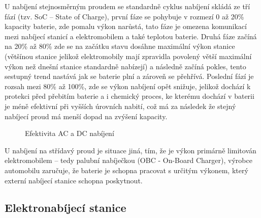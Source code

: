 \documentclass[a4paper,11pt]{article}
\begin{document}
U nabíjení stejnosměrným proudem se standardně cyklus nabíjení skládá ze tří fází (tzv. SoC -- State of Charge), první
fáze se pohybuje v rozmezí 0 až 20\% kapacity baterie, zde pomalu výkon narůstá, tato fáze je omezena komunikací
mezi nabíjecí stanicí a elektromobilem a také teplotou baterie. Druhá fáze začíná na 20\% až 80\% zde se na začátku
stavu dosáhne maximální výkon stanice (většínou stanice jelikož elektromobily mají zpravidla povolený větší maximální výkon
než dnešní stanice standardně nabízejí) a následně začíná pokles, tento sestupný trend nastává jak se baterie plní a
zároveň se přehřívá. Poslední fází je rozsah mezi 80\% až 100\%, zde se výkon nabíjení opět snižuje, jelikož
dochází k protekci před přebitím baterie a i chemický proces, ke kterému dochází v baterii je méně efektivní 
při vyšších úrovních nabití, což má za následek že stejný nabíjecí proud má menší dopad na zvýšení kapacity.\cite{nabijeci_krivka}

\begin{figure}[H]
    \centering
    \caption{Efektivita AC a DC nabíjení \cite{rozdil_mezi_ac_dc_nabijenim_graf}}
    \label{figure:ac-dc-charging-efficency}
\end{figure}

U nabíjení na střídavý proud je situace jiná, tím, že je výkon primárně limitován elektromobilem -- tedy palubní nabíječkou 
(OBC - On-Board Charger), výrobce automobilu zaručuje, že baterie je schopna pracovat s určitým výkonem, který externí
nabíjecí stanice schopna poskytnout. %

\subsection{Elektronabíjecí stanice}
\end{document}
